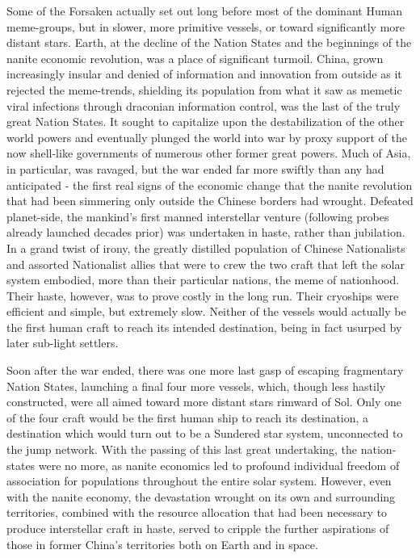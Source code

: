 Some of the Forsaken actually set out long before most of the dominant
Human meme-groups, but in slower, more primitive vessels, or toward
significantly more distant stars. Earth, at the decline of the Nation
States and the beginnings of the nanite economic revolution, was a
place of significant turmoil. China, grown increasingly insular and
denied of information and innovation from outside as it rejected the
meme-trends, shielding its population from what it saw as memetic
viral infections through draconian information control, was the last
of the truly great Nation States. It sought to capitalize upon the
destabilization of the other world powers and eventually plunged the
world into war by proxy support of the now shell-like governments of
numerous other former great powers. Much of Asia, in particular, was
ravaged, but the war ended far more swiftly than any had anticipated -
the first real signs of the economic change that the nanite revolution
that had been simmering only outside the Chinese borders had
wrought. Defeated planet-side, the mankind's first manned interstellar
venture (following probes already launched decades prior) was
undertaken in haste, rather than jubilation. In a grand twist of
irony, the greatly distilled population of Chinese Nationalists and
assorted Nationalist allies that were to crew the two craft that left
the solar system embodied, more than their particular nations, the
meme of nationhood. Their haste, however, was to prove costly in the
long run. Their cryoships were efficient and simple, but extremely
slow. Neither of the vessels would actually be the first human craft
to reach its intended destination, being in fact usurped by later
sub-light settlers.

Soon after the war ended, there was one more last gasp of escaping
fragmentary Nation States, launching a final four more vessels, which,
though less hastily constructed, were all aimed toward more distant
stars rimward of Sol. Only one of the four craft would be the first
human ship to reach its destination, a destination which would turn
out to be a Sundered star system, unconnected to the jump
network. With the passing of this last great undertaking, the
nation-states were no more, as nanite economics led to profound
individual freedom of association for populations throughout the
entire solar system. However, even with the nanite economy, the
devastation wrought on its own and surrounding territories, combined
with the resource allocation that had been necessary to produce
interstellar craft in haste, served to cripple the further aspirations
of those in former China's territories both on Earth and in space.

